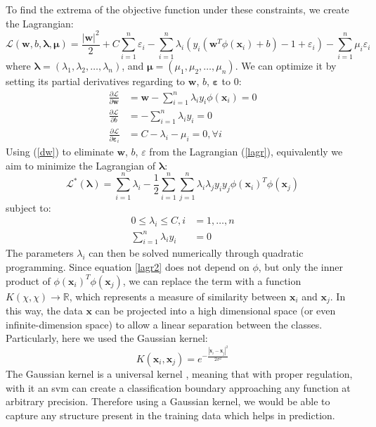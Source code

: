 To find the extrema of the objective function under these constraints, we create the Lagrangian:
\begin{equation} \label{lagr}
    \mathcal{L}(\mathbf{w}, b, \mathbf{\lambda}, \mathbf{\mu})=\frac{|\mathbf{w}|^2}{2} + C\sum_{i=1}^n\varepsilon_i - \sum_{i=1}^n \lambda_i(y_i(\mathbf{w}^T\phi(\mathbf{x}_i) + b) - 1 + \varepsilon_i) - \sum_{i=1}^n \mu_i\varepsilon_i
\end{equation}
where $\mathbf{\lambda}=(\lambda_1, \lambda_2, \ldots, \lambda_n)$, and $\mathbf{\mu}=(\mu_1, \mu_2, \ldots, \mu_n)$. We can optimize it by setting its partial derivatives regarding to $\mathbf{w}$, $b$, $\mathbf{\varepsilon}$ to 0:
\begin{align}\label{dw}
    \frac{\partial\mathcal{L}}{\partial\mathbf{w}} &= \mathbf{w} - \sum_{i=1}^n \lambda_i  y_i  \phi(\mathbf{x}_i) = 0 \nonumber\\ 
    \frac{\partial\mathcal{L}}{\partial{b}} &= - \sum_{i=1}^n \lambda_i y_i = 0 \\
    \frac{\partial\mathcal{L}}{\partial{\mathbf{\varepsilon}_i}} &= C - \lambda_i - \mu_i = 0, \forall i  \nonumber 
\end{align}
Using (\ref{dw}) to eliminate $\mathbf{w}$, $b$, $\varepsilon$ from the Lagrangian (\ref{lagr}), equivalently we aim to minimize the Lagrangian of $\mathbf{\lambda}$:
\begin{equation} \label{lagr2}
    \mathcal{L}^*(\mathbf{\lambda}) = \sum_{i=1}^{n} \lambda_i - \frac{1}{2}\sum_{i=1}^n \sum_{j=1}^n \lambda_i \lambda_j y_i y_j \phi(\mathbf{x}_i)^T\phi(\mathbf{x}_j)
\end{equation}
subject to:
\begin{align*}
    0 \leq \lambda_i \leq C, i &= 1,\ldots,n \\
    \sum_{i=1}^n \lambda_i y_i &= 0
\end{align*}
The parameters $\lambda_i$ can then be solved numerically through quadratic programming. Since equation \ref{lagr2} does not depend on $\phi$, but only the inner product of $\phi(\mathbf{x}_i)^T\phi(\mathbf{x}_j)$, we can replace the term with a function $K(\chi, \chi) \to \mathbb{R}$, which represents a measure of similarity between $\mathbf{x}_i$ and $ \mathbf{x}_j$. In this way, the data $\mathbf{x}$ can be projected into a high dimensional space (or even infinite-dimension space) to allow a linear separation between the classes. Particularly, here we used the Gaussian kernel:
\begin{equation*}
    K(\mathbf{x}_i, \mathbf{x}_j) = e^{-\frac{|\mathbf{x}_i - \mathbf{x}_j|^2}{2\sigma^2}}
\end{equation*}
The Gaussian kernel is a universal kernel , meaning that with proper regulation, with it an \gls{svm} can create a classification boundary approaching any function at arbitrary precision. Therefore using a Gaussian kernel, we would be able to capture any structure present in the training data which helps in prediction.

